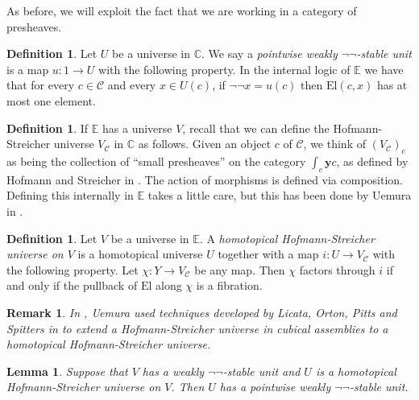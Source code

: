 \documentclass[a4paper]{amsart}
\newtheorem{lemma}[theorem]{Lemma}
\newtheorem{remark}[theorem]{Remark}
\theoremstyle{definition}
\newtheorem{definition}[theorem]{Definition}
\newcommand{\cat}[1]{\mathbb{#1}}
\newcommand{\catc}{\cat{C}}
\newcommand{\smcat}[1]{\mathcal{#1}}
\newcommand{\elv}{\mathrm{El}}
\newcommand{\yoneda}{\mathbf{y}}
\begin{document}
As before, we will exploit the fact that we are working in a category
of presheaves.
\begin{definition}
  Let $U$ be a universe in $\catc$. We say a \emph{pointwise weakly
    $\neg \neg$-stable unit} is a map $u \colon 1 \to U$ with the
  following property. In the internal logic of $\cat{E}$ we have that
  for every $c \in \smcat{C}$ and every $x \in U(c)$, if $\neg \neg x
  = u(c)$ then $\elv(c, x)$ has at most one element.
\end{definition}

\begin{definition}
  If $\cat{E}$ has a universe $V$, recall that we can define the
  Hofmann-Streicher universe $V_\smcat{C}$ in $\catc$ as
  follows. Given an object $c$ of $\smcat{C}$, we think of
  $(V_\smcat{C})_c$ as being the collection of ``small presheaves'' on
  the category $\int_c \yoneda c$, as defined by Hofmann and Streicher
  in \cite{hofmannstreicherliftuniv}. The action of morphisms is
  defined via composition. Defining this internally in $\cat{E}$ takes
  a little care, but this has been done by Uemura in \cite[Section
  4.1]{uemuracubasm}.
\end{definition}

\begin{definition}
  Let $V$ be a universe in $\cat{E}$. A \emph{homotopical
    Hofmann-Streicher universe on $V$} is a homotopical universe $U$
  together with a map $i \colon U \to V_\smcat{C}$ with the following
  property. Let $\chi \colon Y \to V_\smcat{C}$ be any map. Then
  $\chi$ factors through $i$ if and only if the pullback of $\elv$
  along $\chi$ is a fibration.
\end{definition}

\begin{remark}
  In \cite{uemuracubasm}, Uemura used techniques developed by Licata,
  Orton, Pitts and Spitters in \cite{lops} to extend a
  Hofmann-Streicher universe in cubical assemblies to a homotopical
  Hofmann-Streicher universe.
\end{remark}

\begin{lemma}
  \label{lem:negnegunittopointwise}
  Suppose that $V$ has a weakly $\neg \neg$-stable unit and $U$ is a
  homotopical Hofmann-Streicher universe on $V$. Then $U$ has a
  pointwise weakly $\neg \neg$-stable unit.
\end{lemma}
\end{document}
